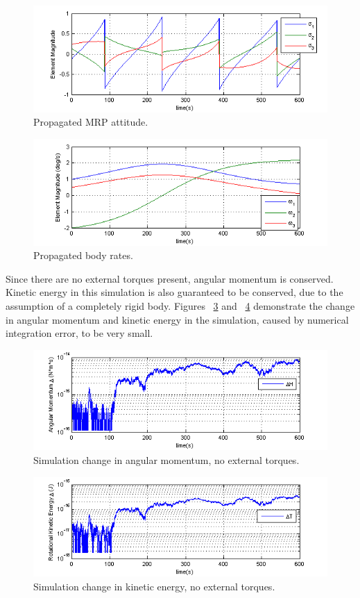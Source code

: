\documentclass[paper]{aiaaNew}
\begin{document}
 \begin{figure}[htb]
 	\centering
 	\includegraphics[scale=0.95]{Figures/MRP_Prop}
 	\caption{Propagated MRP attitude.}
 	\label{fig:MRP_Prop}
 \end{figure}
 \begin{figure}[htb]
 	\centering
 	\includegraphics[]{Figures/w_Prop}
 	\caption{Propagated body rates.}
 	\label{fig:w_Prop}
 \end{figure}
Since there are no external torques present, angular momentum is conserved. Kinetic energy in this simulation is also guaranteed to be conserved, due to the assumption of a completely rigid body.  Figures ~\ref{fig:dH} and ~\ref{fig:dT} demonstrate the change in angular momentum and kinetic energy in the simulation, caused by numerical integration error, to be very small.
 \begin{figure}[htb]
 	\centering
 	\includegraphics[]{Figures/dH}
 	\caption{Simulation change in angular momentum, no external torques.}
 	\label{fig:dH}
 \end{figure}
 \begin{figure}[htb]
 	\centering
 	\includegraphics[]{Figures/dT}
 	\caption{Simulation change in kinetic energy, no external torques.}
 	\label{fig:dT}
 \end{figure}
\end{document}
